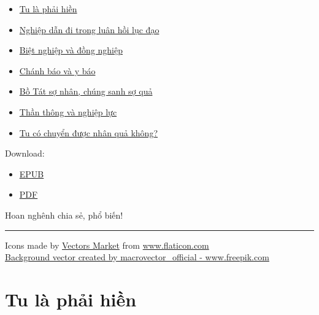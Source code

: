 \documentclass[
  12pt,
  oneside]{book}
\providecommand{\tightlist}{%
  \setlength{\itemsep}{0pt}\setlength{\parskip}{0pt}}
\begin{document}
\begin{itemize}
\tightlist
\item
  \href{https://phapduyen.github.io/tu-la-chuyen-nghiep/tu-la-phai-hien}{Tu là phải hiền}
\item
  \href{https://phapduyen.github.io/tu-la-chuyen-nghiep/nghiep-dan-di-trong-luan-hoi-luc-dao}{Nghiệp dẫn đi trong luân hồi lục đạo}
\item
  \href{https://phapduyen.github.io/tu-la-chuyen-nghiep/biet-nghiep-va-dong-nghiep}{Biệt nghiệp và đồng nghiệp}
\item
  \href{https://phapduyen.github.io/tu-la-chuyen-nghiep/chanh-bao-va-y-bao}{Chánh báo và y báo}
\item
  \href{https://phapduyen.github.io/tu-la-chuyen-nghiep/bo-tat-so-nhan-chung-sanh-so-qua}{Bồ Tát sợ nhân, chúng sanh sợ quả}
\item
  \href{https://phapduyen.github.io/tu-la-chuyen-nghiep/than-thong-va-nghiep-luc}{Thần thông và nghiệp lực}
\item
  \href{https://phapduyen.github.io/tu-la-chuyen-nghiep/tu-co-chuyen-duoc-nhan-qua-khong}{Tu có chuyển được nhân quả không?}
\end{itemize}

Download:

\begin{itemize}
\tightlist
\item
  \href{https://phapduyen.github.io/tu-la-chuyen-nghiep/tu-la-chuyen-nghiep.epub}{EPUB}
\item
  \href{https://phapduyen.github.io/tu-la-chuyen-nghiep/tu-la-chuyen-nghiep.pdf}{PDF}
\end{itemize}

Hoan nghênh chia sẻ, phổ biến!

\begin{center}\rule{0.5\linewidth}{0.5pt}\end{center}

Icons made by \href{https://www.flaticon.com/authors/vectors-market}{Vectors Market} from \href{https://www.flaticon.com}{www.flaticon.com}\\
\href{https://www.freepik.com/vectors/background}{Background vector created by macrovector\_official - www.freepik.com}

\hypertarget{tu-la-phai-hien}{%
\chapter*{Tu là phải hiền}\label{tu-la-phai-hien}}
\end{document}
